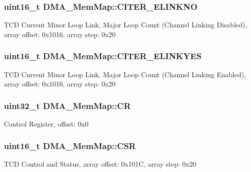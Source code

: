 \subsubsection[{C\+I\+T\+E\+R\+\_\+\+E\+L\+I\+N\+K\+N\+O}]{\setlength{\rightskip}{0pt plus 5cm}uint16\+\_\+t D\+M\+A\+\_\+\+Mem\+Map\+::\+C\+I\+T\+E\+R\+\_\+\+E\+L\+I\+N\+K\+N\+O}\label{struct_d_m_a___mem_map_a9bb0ed26839d915ea750b157a6f59f7a}
T\+C\+D Current Minor Loop Link, Major Loop Count (Channel Linking Disabled), array offset\+: 0x1016, array step\+: 0x20 \hypertarget{struct_d_m_a___mem_map_ac7590f97646d696dcb5082f4060859f0}{}
\subsubsection[{C\+I\+T\+E\+R\+\_\+\+E\+L\+I\+N\+K\+Y\+E\+S}]{\setlength{\rightskip}{0pt plus 5cm}uint16\+\_\+t D\+M\+A\+\_\+\+Mem\+Map\+::\+C\+I\+T\+E\+R\+\_\+\+E\+L\+I\+N\+K\+Y\+E\+S}\label{struct_d_m_a___mem_map_ac7590f97646d696dcb5082f4060859f0}
T\+C\+D Current Minor Loop Link, Major Loop Count (Channel Linking Enabled), array offset\+: 0x1016, array step\+: 0x20 \hypertarget{struct_d_m_a___mem_map_ac2a6179596986e5c7b8794eaab4166e3}{}
\subsubsection[{C\+R}]{\setlength{\rightskip}{0pt plus 5cm}uint32\+\_\+t D\+M\+A\+\_\+\+Mem\+Map\+::\+C\+R}\label{struct_d_m_a___mem_map_ac2a6179596986e5c7b8794eaab4166e3}
Control Register, offset\+: 0x0 \hypertarget{struct_d_m_a___mem_map_a3acaffbe8a6ec6cf0ba28d9e77a52aca}{}
\subsubsection[{C\+S\+R}]{\setlength{\rightskip}{0pt plus 5cm}uint16\+\_\+t D\+M\+A\+\_\+\+Mem\+Map\+::\+C\+S\+R}\label{struct_d_m_a___mem_map_a3acaffbe8a6ec6cf0ba28d9e77a52aca}
T\+C\+D Control and Status, array offset\+: 0x101\+C, array step\+: 0x20 \hypertarget{struct_d_m_a___mem_map_ae2b0e842221342f28893b3399e17cf82}{}
